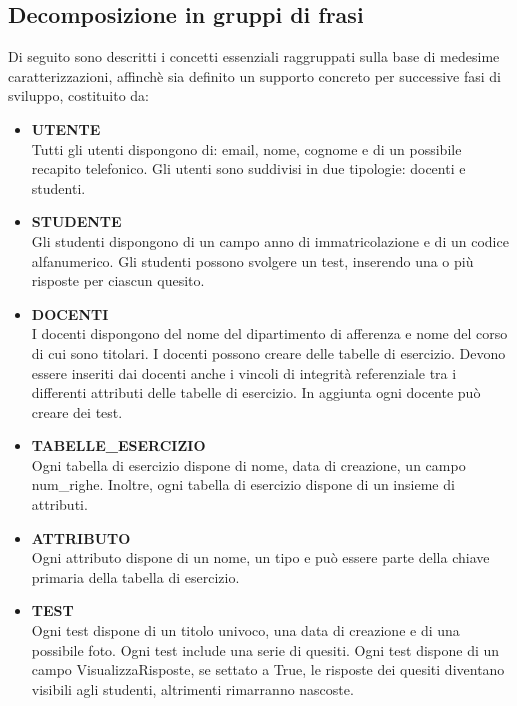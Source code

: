 \documentclass{article}
\begin{document}
\subsection{Decomposizione in gruppi di frasi}
\large
Di seguito sono descritti i concetti essenziali raggruppati sulla base di medesime caratterizzazioni, affinchè sia definito un supporto concreto per successive fasi di sviluppo, costituito da:
\begin{itemize}[label={-}]
    \itemsep1px
    \item \textbf{UTENTE} \vspace*{3px}\\ Tutti gli utenti dispongono di: email, nome, cognome e di un possibile recapito telefonico. Gli utenti sono suddivisi in due tipologie: docenti e studenti. 
    \item \textbf{STUDENTE} \vspace*{3px}\\ Gli studenti dispongono di un campo anno di immatricolazione e di un codice alfanumerico. Gli studenti possono svolgere un test, inserendo una o più risposte per ciascun quesito.
    \item \textbf{DOCENTI} \vspace*{3px}\\ I docenti dispongono del nome del dipartimento di afferenza e nome del corso di cui sono titolari. I docenti possono creare delle tabelle di esercizio. Devono essere inseriti dai docenti anche i vincoli di integrità referenziale tra i differenti attributi delle tabelle di esercizio. In aggiunta ogni docente può creare dei test.
    \item \textbf{TABELLE\_ESERCIZIO} \vspace*{3px}\\ Ogni tabella di esercizio dispone di nome, data di creazione, un campo num\_righe. Inoltre, ogni tabella di esercizio dispone di un insieme di attributi.
    \item \textbf{ATTRIBUTO} \vspace*{3px}\\ Ogni attributo dispone di un nome, un tipo e può essere parte della chiave primaria della tabella di esercizio. 
    \item \textbf{TEST} \vspace*{3px}\\ Ogni test dispone di un titolo univoco, una data di creazione e di una possibile foto. Ogni test include una serie di quesiti. Ogni test dispone di un campo VisualizzaRisposte, se settato a True, le risposte dei quesiti diventano visibili agli studenti, altrimenti rimarranno nascoste.

\end{itemize}
\end{document}
